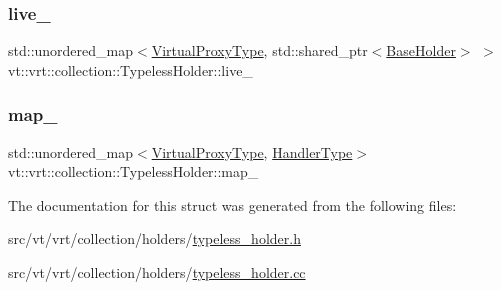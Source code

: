 \subsubsection{\texorpdfstring{live\+\_\+}{live\_}}
{\footnotesize\ttfamily std\+::unordered\+\_\+map$<$\hyperlink{namespacevt_a1b417dd5d684f045bb58a0ede70045ac}{Virtual\+Proxy\+Type}, std\+::shared\+\_\+ptr$<$\hyperlink{structvt_1_1vrt_1_1collection_1_1_base_holder}{Base\+Holder}$>$ $>$ vt\+::vrt\+::collection\+::\+Typeless\+Holder\+::live\+\_\+\hspace{0.3cm}{\ttfamily [private]}}

\mbox{\label{structvt_1_1vrt_1_1collection_1_1_typeless_holder_a0981e429155d61f17b0d0149eea20942}} 
\subsubsection{\texorpdfstring{map\+\_\+}{map\_}}
{\footnotesize\ttfamily std\+::unordered\+\_\+map$<$\hyperlink{namespacevt_a1b417dd5d684f045bb58a0ede70045ac}{Virtual\+Proxy\+Type}, \hyperlink{namespacevt_af64846b57dfcaf104da3ef6967917573}{Handler\+Type}$>$ vt\+::vrt\+::collection\+::\+Typeless\+Holder\+::map\+\_\+\hspace{0.3cm}{\ttfamily [private]}}



The documentation for this struct was generated from the following files\+:\begin{DoxyCompactItemize}
\item 
src/vt/vrt/collection/holders/\hyperlink{typeless__holder_8h}{typeless\+\_\+holder.\+h}\item 
src/vt/vrt/collection/holders/\hyperlink{typeless__holder_8cc}{typeless\+\_\+holder.\+cc}\end{DoxyCompactItemize}
